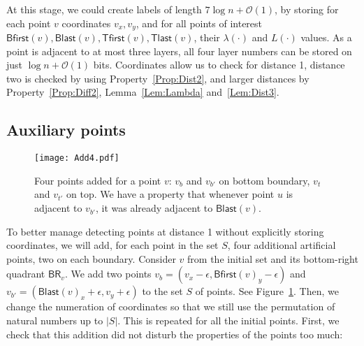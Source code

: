 \documentclass[a4paper,11pt]{article}
\newcommand{\Oh}{\mathcal{O}}
\newcommand{\lam}{\lambda}
\newcommand{\BR}{\mathsf{BR}}
\newcommand{\Blast}{\mathsf{Blast}}
\newcommand{\Bfirst}{\mathsf{Bfirst}}
\newcommand{\Tlast}{\mathsf{Tlast}}
\newcommand{\Tfirst}{\mathsf{Tfirst}}
\begin{document}
At this stage, we could create labels of length $7\log{n}+\Oh(1)$, by storing for each point $v$ coordinates 
$v_x,v_y$, and for all points of interest $\Bfirst(v),\Blast(v),\Tfirst(v),\Tlast(v)$, their $\lam(\cdot)$ and $L(\cdot)$ values.
As a point is adjacent to at most three layers, all four layer numbers can be stored on just $\log{n}+\Oh(1)$ bits.
Coordinates allow us to check for distance 1, distance two is checked by using Property~\ref{Prop:Dist2},
and larger distances by Property~\ref{Prop:Diff2}, Lemma~\ref{Lem:Lambda} and~\ref{Lem:Dist3}.

\subsection{Auxiliary points}

\begin{figure}[h]
\begin{center}
  \texttt{[image: Add4.pdf]}
\end{center}
\caption{Four points added for a point $v$: $v_{b}$ and $v_{b'}$ on bottom boundary, $v_{t}$ and $v_{t'}$ on top.
We have a property that whenever point $u$ is adjacent to $v_{b'}$, it was already adjacent to $\Blast(v)$.}
\label{Fig:Add4}
\end{figure}

To better manage detecting points at distance 1 without explicitly storing coordinates,
we will add, for each point in the set $S$, four additional artificial points, two on each boundary.
Consider $v$ from the initial set and its bottom-right quadrant $\BR_v$.
We add two points $v_{b}=(v_x-\epsilon, \Bfirst(v)_y-\epsilon)$ and $v_{b'}=(\Blast(v)_x+\epsilon,v_y+\epsilon)$ to the set $S$ of points.
See Figure~\ref{Fig:Add4}.
Then, we change the numeration of coordinates so that we still use the permutation of natural numbers up to $|S|$.
This is repeated for all the initial points.
First, we check that this addition did not disturb the properties of the points too much:
\end{document}
